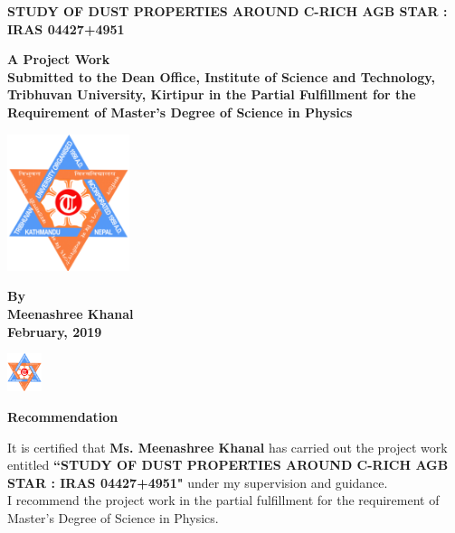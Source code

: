 \documentclass[12pt,a4paper]{report}
\author{Devendra}
\begin{document}
	\begin{titlepage}
		\centering
		\Huge\bf STUDY OF DUST PROPERTIES AROUND C-RICH AGB STAR : IRAS 04427+4951
		\vspace{0.1in}
		\begin{center}
			\Large\bf  A Project Work\\
			\vspace{0.1in}
			Submitted to the Dean Office,
			Institute of Science and Technology,
			Tribhuvan University, Kirtipur in the Partial Fulfillment for the
			Requirement of Master's Degree of Science in Physics
		\end{center}
		\vspace{0.5cm}
		
		\centering
		\includegraphics[height=4cm]{logo}
		\vspace{1.5cm}
	\begin{center}
		\Large\bf By
		\vspace{0.1cm}\\
		\huge\bf Meenashree Khanal\\
		\Large\bf February, 2019
	\end{center}
\end{titlepage}

\begin{center}
	\includegraphics[width=1cm]{logo}
\end{center}	
\begin{center}
	\Large{\bfseries Recommendation}
\end{center}
It is certified that {\bfseries Ms. Meenashree Khanal} has carried out the project work entitled {\bfseries ``STUDY OF DUST PROPERTIES AROUND C-RICH AGB STAR : IRAS 04427+4951"} under my supervision and guidance.\\ [0.5cm]
I recommend the project work in the partial fulfillment for the requirement of Master's Degree of Science in Physics.\\[2cm]
\end{document}

